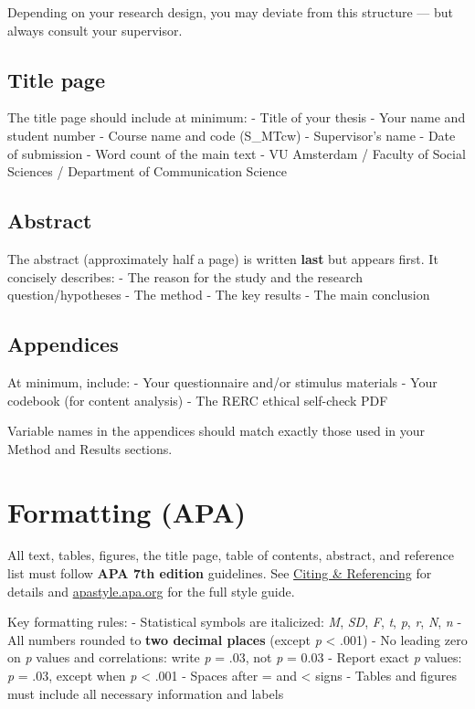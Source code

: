 \documentclass[
  11pt,
  a4paper,
]{scrbook}
\begin{document}
Depending on your research design, you may deviate from this structure
--- but always consult your supervisor.

\subsection{Title page}\label{title-page}

The title page should include at minimum: - Title of your thesis - Your
name and student number - Course name and code (S\_MTcw) - Supervisor's
name - Date of submission - Word count of the main text - VU Amsterdam /
Faculty of Social Sciences / Department of Communication Science

\subsection{Abstract}\label{abstract}

The abstract (approximately half a page) is written \textbf{last} but
appears first. It concisely describes: - The reason for the study and
the research question/hypotheses - The method - The key results - The
main conclusion

\subsection{Appendices}\label{appendices}

At minimum, include: - Your questionnaire and/or stimulus materials -
Your codebook (for content analysis) - The RERC ethical self-check PDF

Variable names in the appendices should match exactly those used in your
Method and Results sections.

\section{Formatting (APA)}\label{formatting-apa}

All text, tables, figures, the title page, table of contents, abstract,
and reference list must follow \textbf{APA 7th edition} guidelines. See
\href{citation.qmd}{Citing \& Referencing} for details and
\href{https://apastyle.apa.org/}{apastyle.apa.org} for the full style
guide.

Key formatting rules: - Statistical symbols are italicized: \emph{M},
\emph{SD}, \emph{F}, \emph{t}, \emph{p}, \emph{r}, \emph{N}, \emph{n} -
All numbers rounded to \textbf{two decimal places} (except \emph{p}
\textless{} .001) - No leading zero on \emph{p} values and correlations:
write \emph{p} = .03, not \emph{p} = 0.03 - Report exact \emph{p}
values: \emph{p} = .03, except when \emph{p} \textless{} .001 - Spaces
after = and \textless{} signs - Tables and figures must include all
necessary information and labels
\end{document}
